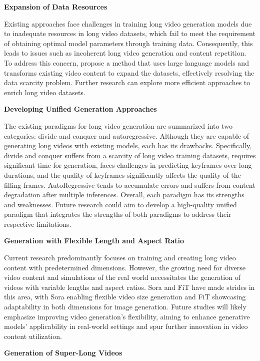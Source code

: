 \documentclass{article}
\begin{document}
\noindent\textbf{Expansion of Data Resources}


\noindent Existing approaches face challenges in training long video generation models due to inadequate resources in long video datasets, which fail to meet the requirement of obtaining optimal model parameters through training data. Consequently, this leads to issues such as incoherent long video generation and content repetition. To address this concern, \cite{VidRD} propose a method that uses large language models and transforms existing video content to expand the datasets, effectively resolving the data scarcity problem. Further research can explore more efficient approaches to enrich long video datasets.


\noindent\textbf{Developing Unified Generation Approaches}


\noindent The existing paradigms for long video generation are summarized into two categories: divide and conquer and autoregressive. Although they are capable of generating long videos with existing models, each has its drawbacks. Specifically, divide and conquer suffers from a scarcity of long video training datasets, requires significant time for generation, faces challenges in predicting keyframes over long durations, and the quality of keyframes significantly affects the quality of the filling frames. AutoRegressive tends to accumulate errors and suffers from content degradation after multiple inferences. Overall, each paradigm has its strengths and weaknesses. Future research could aim to develop a high-quality unified paradigm that integrates the strengths of both paradigms to address their respective limitations.


\noindent\textbf{Generation with Flexible Length and Aspect Ratio}


\noindent Current research predominantly focuses on training and creating long video content with predetermined dimensions. However, the growing need for diverse video content and simulations of the real world necessitates the generation of videos with variable lengths and aspect ratios. Sora \citep{Sora} and FiT \citep{FiT} have made strides in this area, with Sora enabling flexible video size generation and FiT showcasing adaptability in both dimensions for image generation. Future studies will likely emphasize improving video generation's flexibility, aiming to enhance generative models' applicability in real-world settings and spur further innovation in video content utilization.


\noindent\textbf{Generation of Super-Long Videos}
\end{document}
